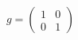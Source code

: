 \documentclass[preview]{standalone}
\begin{document}
\begin{align*}
g = \begin{pmatrix} 1 & 0 \\ 0 & 1 \end{pmatrix}
\end{align*}
\end{document}
